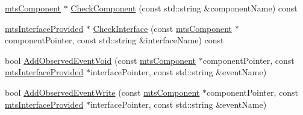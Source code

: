 {\bf }\par
\begin{DoxyCompactItemize}
\item 
\hyperlink{classmts_component}{mts\+Component} $\ast$ \hyperlink{classmts_collector_event_a37607d9e651b28e6784e36cf1042cac9}{Check\+Component} (const std\+::string \&component\+Name) const 
\item 
\hyperlink{classmts_interface_provided}{mts\+Interface\+Provided} $\ast$ \hyperlink{classmts_collector_event_a10f83def69322d0c14f924d89379b702}{Check\+Interface} (const \hyperlink{classmts_component}{mts\+Component} $\ast$component\+Pointer, const std\+::string \&interface\+Name) const 
\end{DoxyCompactItemize}

{\bf }\par
\begin{DoxyCompactItemize}
\item 
bool \hyperlink{classmts_collector_event_ab0f72db1e0a7d9da57632be533c5f09f}{Add\+Observed\+Event\+Void} (const \hyperlink{classmts_component}{mts\+Component} $\ast$component\+Pointer, const \hyperlink{classmts_interface_provided}{mts\+Interface\+Provided} $\ast$interface\+Pointer, const std\+::string \&event\+Name)
\item 
bool \hyperlink{classmts_collector_event_a73d4c8294d564becda489f6229a92665}{Add\+Observed\+Event\+Write} (const \hyperlink{classmts_component}{mts\+Component} $\ast$component\+Pointer, const \hyperlink{classmts_interface_provided}{mts\+Interface\+Provided} $\ast$interface\+Pointer, const std\+::string \&event\+Name)
\end{DoxyCompactItemize}

